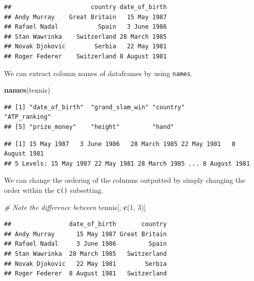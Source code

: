 \documentclass[12pt,]{krantz}
\newenvironment{Shaded}{\begin{snugshade}}{\end{snugshade}}
\newcommand{\KeywordTok}[1]{\textcolor[rgb]{0.27,0.27,0.27}{\textbf{#1}}}
\newcommand{\DecValTok}[1]{\textcolor[rgb]{0.06,0.06,0.06}{#1}}
\newcommand{\CommentTok}[1]{\textcolor[rgb]{0.37,0.37,0.37}{\textit{#1}}}
\newcommand{\OperatorTok}[1]{\textcolor[rgb]{0.43,0.43,0.43}{\textbf{#1}}}
\newcommand{\NormalTok}[1]{#1}
\begin{document}
\begin{verbatim}
##                      country date_of_birth
## Andy Murray    Great Britain   15 May 1987
## Rafael Nadal           Spain   3 June 1986
## Stan Wawrinka    Switzerland 28 March 1985
## Novak Djokovic        Serbia   22 May 1981
## Roger Federer    Switzerland 8 August 1981
\end{verbatim}

We can extract column names of dataframes by using \texttt{names}.

\begin{Shaded}
\begin{Highlighting}[]
\KeywordTok{names}\NormalTok{(tennis)}
\end{Highlighting}
\end{Shaded}

\begin{verbatim}
## [1] "date_of_birth"  "grand_slam_win" "country"        "ATP_ranking"   
## [5] "prize_money"    "height"         "hand"
\end{verbatim}

\begin{Shaded}
\end{Shaded}

\begin{verbatim}
## [1] 15 May 1987   3 June 1986   28 March 1985 22 May 1981   8 August 1981
## 5 Levels: 15 May 1987 22 May 1981 28 March 1985 ... 8 August 1981
\end{verbatim}

We can change the ordering of the columns outputted by simply changing
the order within the \texttt{c()} subsetting.

\begin{Shaded}
\begin{Highlighting}[]
\CommentTok{# Note the difference between }
\NormalTok{tennis[, }\KeywordTok{c}\NormalTok{(}\DecValTok{1}\NormalTok{, }\DecValTok{3}\NormalTok{)]}
\end{Highlighting}
\end{Shaded}

\begin{verbatim}
##                date_of_birth       country
## Andy Murray      15 May 1987 Great Britain
## Rafael Nadal     3 June 1986         Spain
## Stan Wawrinka  28 March 1985   Switzerland
## Novak Djokovic   22 May 1981        Serbia
## Roger Federer  8 August 1981   Switzerland
\end{verbatim}
\end{document}
